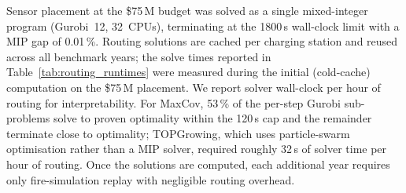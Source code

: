 Sensor placement at the \$75\,M budget was solved as a single mixed-integer program (Gurobi~12, 32~CPUs), terminating at the 1800\,s wall-clock limit with a MIP gap of 0.01\,\%. Routing solutions are cached per charging station and reused across all benchmark years; the solve times reported in Table~\ref{tab:routing_runtimes} were measured during the initial (cold-cache) computation on the \$75\,M placement. We report solver wall-clock per hour of routing for interpretability. For MaxCov, 53\,\% of the per-step Gurobi sub-problems solve to proven optimality within the 120\,s cap and the remainder terminate close to optimality; TOPGrowing, which uses particle-swarm optimisation rather than a MIP solver, required roughly 32\,s of solver time per hour of routing. Once the solutions are computed, each additional year requires only fire-simulation replay with negligible routing overhead.

